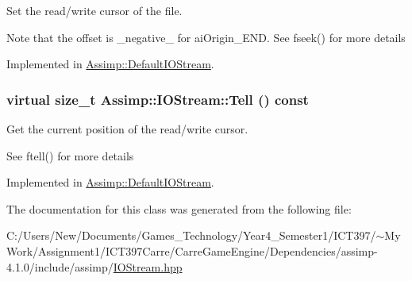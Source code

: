 Set the read/write cursor of the file. 

Note that the offset is \_\-negative\_\- for aiOrigin\_\-END. See fseek() for more details 

Implemented in \hyperlink{class_assimp_1_1_default_i_o_stream_1f4b8aa9afaaa2b300d6cee6165a6a6d}{Assimp::DefaultIOStream}.\hypertarget{class_assimp_1_1_i_o_stream_316ac6cd16b5a493d1313f792c806194}{
\subsubsection[Tell]{\setlength{\rightskip}{0pt plus 5cm}virtual size\_\-t Assimp::IOStream::Tell () const}}
\label{class_assimp_1_1_i_o_stream_316ac6cd16b5a493d1313f792c806194}


Get the current position of the read/write cursor. 

See ftell() for more details 

Implemented in \hyperlink{class_assimp_1_1_default_i_o_stream_561a6cce1927a760e2d04fab87df38f9}{Assimp::DefaultIOStream}.

The documentation for this class was generated from the following file:\begin{CompactItemize}
\item 
C:/Users/New/Documents/Games\_\-Technology/Year4\_\-Semester1/ICT397/$\sim$My Work/Assignment1/ICT397Carre/CarreGameEngine/Dependencies/assimp-4.1.0/include/assimp/\hyperlink{_i_o_stream_8hpp}{IOStream.hpp}\end{CompactItemize}
